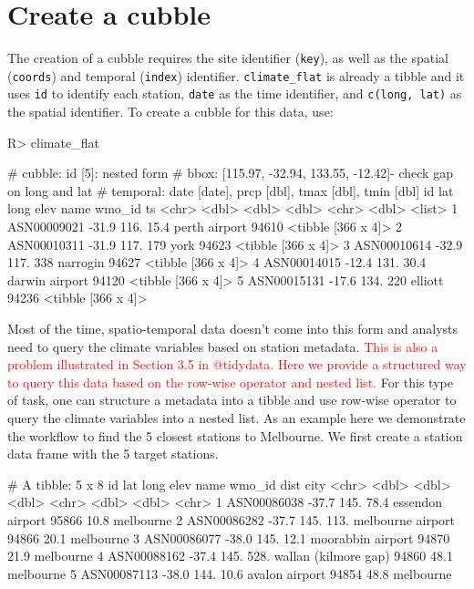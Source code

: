 \documentclass[
]{jss}
\begin{document}
\hypertarget{create-a-cubble}{%
\section{Create a cubble}\label{create-a-cubble}}

The creation of a cubble requires the site identifier (\texttt{key}), as
well as the spatial (\texttt{coords}) and temporal (\texttt{index})
identifier. \texttt{climate\_flat} is already a tibble and it uses
\texttt{id} to identify each station, \texttt{date} as the time
identifier, and \texttt{c(long,\ lat)} as the spatial identifier. To
create a cubble for this data, use:

\begin{CodeChunk}
\begin{CodeInput}
R> climate_flat %
\end{CodeInput}
\begin{CodeOutput}
# cubble:   id [5]: nested form
# bbox:     [115.97, -32.94, 133.55, -12.42]- check gap on long and lat
# temporal: date [date], prcp [dbl], tmax [dbl], tmin [dbl]
  id            lat  long  elev name           wmo_id ts                
  <chr>       <dbl> <dbl> <dbl> <chr>           <dbl> <list>            
1 ASN00009021 -31.9  116.  15.4 perth airport   94610 <tibble [366 x 4]>
2 ASN00010311 -31.9  117. 179   york            94623 <tibble [366 x 4]>
3 ASN00010614 -32.9  117. 338   narrogin        94627 <tibble [366 x 4]>
4 ASN00014015 -12.4  131.  30.4 darwin airport  94120 <tibble [366 x 4]>
5 ASN00015131 -17.6  134. 220   elliott         94236 <tibble [366 x 4]>
\end{CodeOutput}
\end{CodeChunk}

Most of the time, spatio-temporal data doesn't come into this form and
analysts need to query the climate variables based on station metadata.
\textcolor{red}{This is also a problem illustrated in Section 3.5 in @tidydata. Here we provide a structured way to query this data based on the row-wise operator and nested list.}
For this type of task, one can structure a metadata into a tibble and
use row-wise operator to query the climate variables into a nested list.
As an example here we demonstrate the workflow to find the 5 closest
stations to Melbourne. We first create a station data frame with the 5
target stations.

\begin{CodeChunk}
\begin{CodeOutput}
# A tibble: 5 x 8
  id            lat  long  elev name                 wmo_id  dist city     
  <chr>       <dbl> <dbl> <dbl> <chr>                 <dbl> <dbl> <chr>    
1 ASN00086038 -37.7  145.  78.4 essendon airport      95866  10.8 melbourne
2 ASN00086282 -37.7  145. 113.  melbourne airport     94866  20.1 melbourne
3 ASN00086077 -38.0  145.  12.1 moorabbin airport     94870  21.9 melbourne
4 ASN00088162 -37.4  145. 528.  wallan (kilmore gap)  94860  48.1 melbourne
5 ASN00087113 -38.0  144.  10.6 avalon airport        94854  48.8 melbourne
\end{CodeOutput}
\end{CodeChunk}
\end{document}
